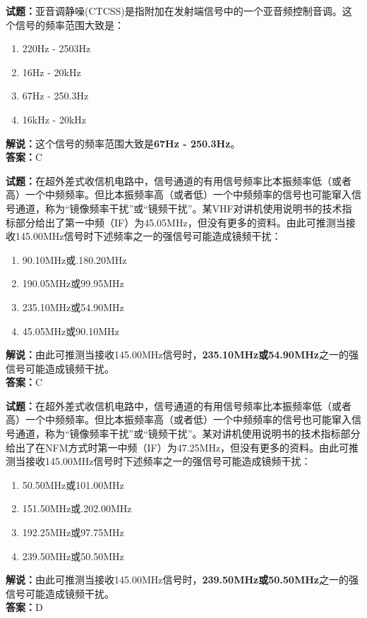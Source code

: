 \documentclass{ctexbook}
\begin{document}
\bigskip


\noindent\textbf{试题：}亚音调静噪(CTCSS)是指附加在发射端信号中的一个亚音频控制音调。这个信号的频率范围大致是：
\begin{enumerate}[leftmargin=3em]
\item 220Hz - 2503Hz
\item 16Hz - 20\unit{\kHz}
\item 67Hz - 250.3Hz
\item 16\unit{\kHz} - 20\unit{\kHz}
\end{enumerate}
\noindent\textbf{解说：}这个信号的频率范围大致是\textbf{67Hz - 250.3Hz}。\\\noindent\textbf{答案：}C



\bigskip


\noindent\textbf{试题：}在超外差式收信机电路中，信号通道的有用信号频率比本振频率低（或者高）一个中频频率。但比本振频率高（或者低）一个中频频率的信号也可能窜入信号通道，称为“镜像频率干扰”或“镜频干扰”。某VHF对讲机使用说明书的技术指标部分给出了第一中频（IF）为45.05\unit{\MHz}，但没有更多的资料。由此可推测当接收145.00\unit{\MHz}信号时下述频率之一的强信号可能造成镜频干扰：
\begin{enumerate}[leftmargin=3em]
\item 90.10\unit{\MHz}或.180.20\unit{\MHz}
\item 190.05\unit{\MHz}或99.95\unit{\MHz}
\item 235.10\unit{\MHz}或54.90\unit{\MHz}
\item 45.05\unit{\MHz}或90.10\unit{\MHz}
\end{enumerate}
\noindent\textbf{解说：}由此可推测当接收145.00\unit{\MHz}信号时，\textbf{235.10\unit{\MHz}或54.90\unit{\MHz}}之一的强信号可能造成镜频干扰。\\\noindent\textbf{答案：}C




\bigskip


\noindent\textbf{试题：}在超外差式收信机电路中，信号通道的有用信号频率比本振频率低（或者高）一个中频频率。但比本振频率高（或者低）一个中频频率的信号也可能窜入信号通道，称为“镜像频率干扰”或“镜频干扰”。某对讲机使用说明书的技术指标部分给出了在NFM方式时第一中频（IF）为47.25\unit{\MHz}，但没有更多的资料。由此可推测当接收145.00\unit{\MHz}信号时下述频率之一的强信号可能造成镜频干扰：%
\begin{enumerate}[leftmargin=3em]
\item 50.50\unit{\MHz}或101.00\unit{\MHz}
\item 151.50\unit{\MHz}或.202.00\unit{\MHz}
\item 192.25\unit{\MHz}或97.75\unit{\MHz}
\item 239.50\unit{\MHz}或50.50\unit{\MHz}
\end{enumerate}
\noindent\textbf{解说：}由此可推测当接收145.00\unit{\MHz}信号时，\textbf{239.50\unit{\MHz}或50.50\unit{\MHz}}之一的强信号可能造成镜频干扰。\\\noindent\textbf{答案：}D
\end{document}
